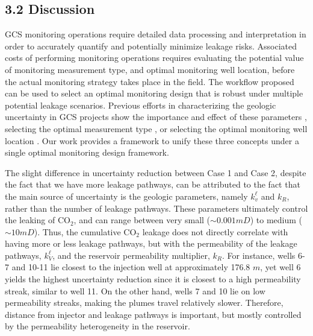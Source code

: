 \documentclass[10pt, twoside]{article}
\begin{document}
\subsection*{\textbf{3.2 Discussion}}
GCS monitoring operations require detailed data processing and interpretation in order to accurately quantify and potentially minimize leakage risks. Associated costs of performing monitoring operations requires evaluating the potential value of monitoring measurement type, and optimal monitoring well location, before the actual monitoring strategy takes place in the field. The workflow proposed can be used to select an optimal monitoring design that is robust under multiple potential leakage scenarios. Previous efforts in characterizing the geologic uncertainty in GCS projects show the importance and effect of these parameters \citep{Jia2018104, Chen2020, Pawar2022}, selecting the optimal measurement type \citep{Yonkofski2016, Oladyshkin2013671}, or selecting the optimal monitoring well location \citep{Sun2013, Sun2019}. Our work provides a framework to unify these three concepts under a single optimal monitoring design framework.

The slight difference in uncertainty reduction between Case 1 and Case 2, despite the fact that we have more leakage pathways, can be attributed to the fact that the main source of uncertainty is the geologic parameters, namely $k_v^\ell$ and $k_R$, rather than the number of leakage pathways. These parameters ultimately control the leaking of CO$_2$, and can range between very small ($\sim 0.001 mD$) to medium ($\sim 10 mD$). Thus, the cumulative CO$_2$ leakage does not directly correlate with having more or less leakage pathways, but with the permeability of the leakage pathways, $k_V^\ell$, and the reservoir permeability multiplier, $k_R$. For instance, wells 6-7 and 10-11 lie closest to the injection well at approximately 176.8 $m$, yet well 6 yields the highest uncertainty reduction since it is closest to a high permeability streak, similar to well 11. On the other hand, wells 7 and 10 lie on low permeability streaks, making the plumes travel relatively slower. Therefore, distance from injector and leakage pathways is important, but mostly controlled by the permeability heterogeneity in the reservoir.
\end{document}
